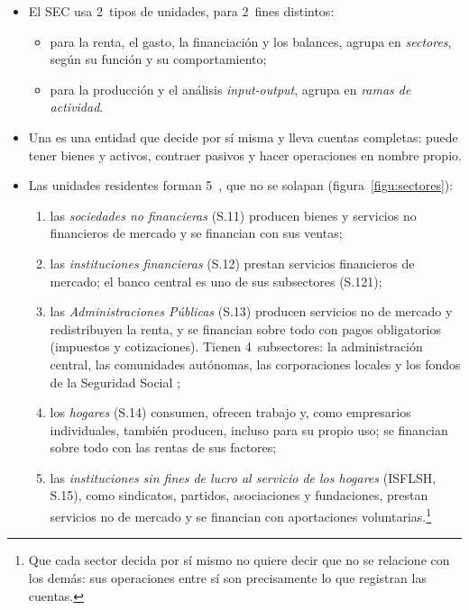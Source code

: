 \documentclass[11pt]{article}
\begin{document}
\begin{itemize}
\item El SEC usa 2~tipos de unidades, para 2~fines distintos:
  \begin{itemize}
  \item para la renta, el gasto, la financiación y los balances, agrupa  en \emph{sectores}, según su función y su comportamiento;
  \item para la producción y el análisis \emph{input-output}, agrupa  en \emph{ramas de actividad}.
  \end{itemize}
\item Una  es una entidad que decide por sí misma y lleva cuentas completas: puede tener bienes y activos, contraer pasivos y hacer operaciones en nombre propio.
\item Las unidades residentes forman 5~, que no se solapan (figura~\ref{figu:sectores}):
  \begin{enumerate}
  \item las \emph{sociedades no financieras} (S.11) producen bienes y servicios no financieros de mercado y se financian con sus ventas;
  \item las \emph{instituciones financieras} (S.12) prestan servicios financieros de mercado; el banco central es uno de sus subsectores (S.121);
  \item las \emph{Administraciones Públicas} (S.13) producen servicios no de mercado y redistribuyen la renta, y se financian sobre todo con pagos obligatorios (impuestos y cotizaciones). Tienen 4~subsectores: la administración central, las comunidades autónomas, las corporaciones locales y los fondos de la Seguridad Social ;
  \item los \emph{hogares} (S.14) consumen, ofrecen trabajo y, como empresarios individuales, también producen, incluso para su propio uso; se financian sobre todo con las rentas de sus factores;
  \item las \emph{instituciones sin fines de lucro al servicio de los hogares} (ISFLSH, S.15), como sindicatos, partidos, asociaciones y fundaciones, prestan servicios no de mercado y se financian con aportaciones voluntarias.\footnote{Que cada sector decida por sí mismo no quiere decir que no se relacione con los demás: sus operaciones entre sí son precisamente lo que registran las cuentas.}
  \end{enumerate}

\end{itemize}
\end{document}

